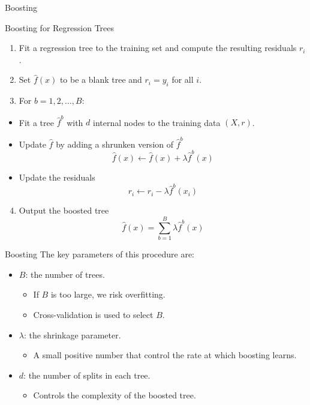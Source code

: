 \documentclass[
  ignorenonframetext,
  aspectratio=169,
]{beamer}
\providecommand{\tightlist}{%
  \setlength{\itemsep}{0pt}\setlength{\parskip}{0pt}}\usepackage{longtable,booktabs,array}
\begin{document}
\begin{frame}{Boosting}
\protect\hypertarget{boosting-1}{}
\begin{block}{Boosting for Regression Trees}
\protect\hypertarget{boosting-for-regression-trees}{}
\begin{enumerate}
\item
  Fit a regression tree to the training set and compute the resulting
  residuals \(r_i\).
\item
  Set \(\hat{f}(x)\) to be a blank tree and \(r_i = y_i\) for all \(i\).
\item
  For \(b = 1,2,\dots, B\):
\end{enumerate}

\begin{itemize}
\item
  Fit a tree \(\hat{f}^b\) with \(d\) internal nodes to the training
  data \((X, r)\).
\item
  Update \(\hat{f}\) by adding a shrunken version of \(\hat{f}^b\)
  \[\hat{f}(x) \leftarrow \hat{f}(x)+\lambda \hat{f}^{b}(x)\]
\item
  Update the residuals
  \[r_{i} \leftarrow r_{i}-\lambda \hat{f}^{b}\left(x_{i}\right)\]
\end{itemize}

\begin{enumerate}
\setcounter{enumi}{3}
\tightlist
\item
  Output the boosted tree
  \[\hat{f}(x)=\sum_{b=1}^{B} \lambda \hat{f}^{b}(x)\]
\end{enumerate}
\end{block}
\end{frame}

\begin{frame}{Boosting}
\protect\hypertarget{boosting-2}{}
The key parameters of this procedure are:

\begin{itemize}
\item
  \(B\): the number of trees.

  \begin{itemize}
  \item
    If \(B\) is too large, we risk overfitting.
  \item
    Cross-validation is used to select \(B\).
  \end{itemize}
\item
  \(\lambda\): the shrinkage parameter.

  \begin{itemize}
  \tightlist
  \item
    A small positive number that control the rate at which boosting
    learns.
  \end{itemize}
\item
  \(d\): the number of splits in each tree.

  \begin{itemize}
  \tightlist
  \item
    Controls the complexity of the boosted tree.
  \end{itemize}
\end{itemize}
\end{frame}
\end{document}
